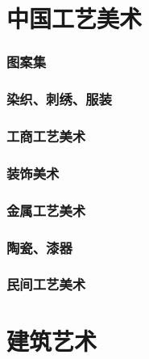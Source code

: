 \documentclass[UTF8]{../RepresentationUniverse}
\begin{document}
    \section{中国工艺美术}
        \subsubsection{图案集}
        \subsubsection{染织、刺绣、服装}
        \subsubsection{工商工艺美术}
        \subsubsection{装饰美术}
        \subsubsection{金属工艺美术}
        \subsubsection{陶瓷、漆器}
        \subsubsection{民间工艺美术}
    \section{建筑艺术}
\end{document}
